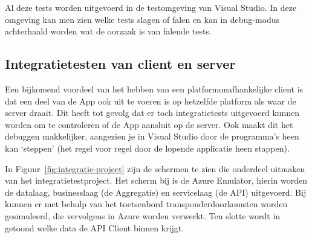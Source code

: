 Al deze tests worden uitgevoerd in de testomgeving van Visual Studio. In deze omgeving kan men zien welke tests slagen of falen en kan in debug-modus achterhaald worden wat de oorzaak is van falende tests.

\subsection{Integratietesten van client en server}
Een bijkomend voordeel van het hebben van een platformonafhankelijke client is dat een deel van de App ook uit te voeren is op hetzelfde platform als waar de server draait. Dit heeft tot gevolg dat er toch integratietests uitgevoerd kunnen worden om te controleren of de App aansluit op de server. Ook maakt dit het debuggen makkelijker, aangezien je  in Visual Studio door de programma's heen kan `steppen' (het regel voor regel door de lopende applicatie heen stappen).

In Figuur~\ref{fig:integratie-project} zijn de schermen te zien die onderdeel uitmaken van het integratietestproject. Het scherm bij  is de Azure Emulator, hierin worden de datalaag, businesslaag (de Aggregatie) en servicelaag (de API) uitgevoerd. Bij  kunnen er met behulp van het toetsenbord transponderdoorkomsten worden gesimuleerd, die vervolgens in Azure worden verwerkt. Ten slotte wordt in  getoond welke data de API Client binnen krijgt.


